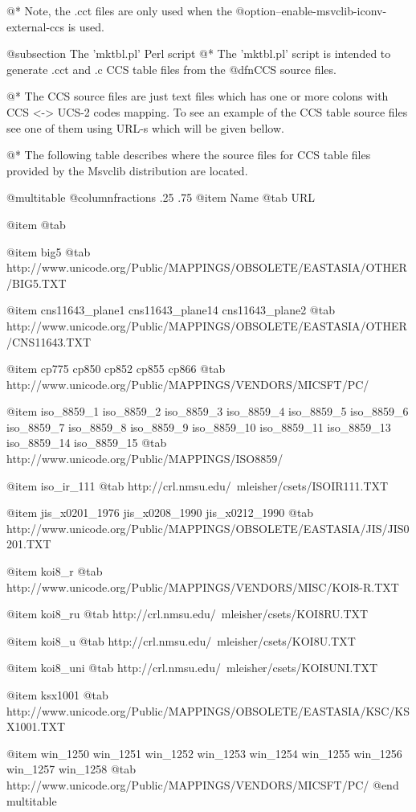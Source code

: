 @*
Note, the .cct files are only used when the
@option{--enable-msvclib-iconv-external-ccs} is used.

@subsection The 'mktbl.pl' Perl script
@*
The 'mktbl.pl' script is intended to generate .cct and .c CCS table
files from the @dfn{CCS source files}.

@*
The CCS source files are just text files which has one or more colons
with CCS <-> UCS-2 codes mapping. To see an example of the CCS table
source files see one of them using URL-s which will be given bellow.

@*
The following table describes where the source files for CCS table files
provided by the Msvclib distribution are located.

@multitable @columnfractions .25 .75
@item
Name
@tab
URL

@item
@tab

@item
big5
@tab
http://www.unicode.org/Public/MAPPINGS/OBSOLETE/EASTASIA/OTHER/BIG5.TXT

@item
cns11643_plane1
cns11643_plane14
cns11643_plane2
@tab
http://www.unicode.org/Public/MAPPINGS/OBSOLETE/EASTASIA/OTHER/CNS11643.TXT

@item
cp775
cp850
cp852
cp855
cp866
@tab
http://www.unicode.org/Public/MAPPINGS/VENDORS/MICSFT/PC/

@item
iso_8859_1
iso_8859_2
iso_8859_3
iso_8859_4
iso_8859_5
iso_8859_6
iso_8859_7
iso_8859_8
iso_8859_9
iso_8859_10
iso_8859_11
iso_8859_13
iso_8859_14
iso_8859_15
@tab
http://www.unicode.org/Public/MAPPINGS/ISO8859/

@item
iso_ir_111
@tab
http://crl.nmsu.edu/~mleisher/csets/ISOIR111.TXT

@item
jis_x0201_1976
jis_x0208_1990
jis_x0212_1990
@tab
http://www.unicode.org/Public/MAPPINGS/OBSOLETE/EASTASIA/JIS/JIS0201.TXT

@item
koi8_r
@tab
http://www.unicode.org/Public/MAPPINGS/VENDORS/MISC/KOI8-R.TXT

@item
koi8_ru
@tab
http://crl.nmsu.edu/~mleisher/csets/KOI8RU.TXT

@item
koi8_u
@tab
http://crl.nmsu.edu/~mleisher/csets/KOI8U.TXT

@item
koi8_uni
@tab
http://crl.nmsu.edu/~mleisher/csets/KOI8UNI.TXT

@item
ksx1001
@tab
http://www.unicode.org/Public/MAPPINGS/OBSOLETE/EASTASIA/KSC/KSX1001.TXT

@item
win_1250
win_1251
win_1252
win_1253
win_1254
win_1255
win_1256
win_1257
win_1258
@tab
http://www.unicode.org/Public/MAPPINGS/VENDORS/MICSFT/PC/
@end multitable

